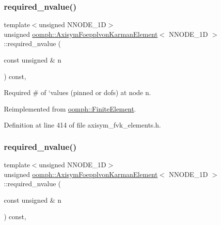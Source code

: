 \subsubsection{\texorpdfstring{required\+\_\+nvalue()}{required\_nvalue()}\hspace{0.1cm}{\footnotesize\ttfamily [1/2]}}
{\footnotesize\ttfamily template$<$unsigned N\+N\+O\+D\+E\+\_\+1D$>$ \\
unsigned \hyperlink{classoomph_1_1AxisymFoepplvonKarmanElement}{oomph\+::\+Axisym\+Foepplvon\+Karman\+Element}$<$ N\+N\+O\+D\+E\+\_\+1D $>$\+::required\+\_\+nvalue (\begin{DoxyParamCaption}\item[{const unsigned \&}]{n }\end{DoxyParamCaption}) const\hspace{0.3cm}{\ttfamily [inline]}, {\ttfamily [virtual]}}



Required \# of `values\textquotesingle{} (pinned or dofs) at node n. 



Reimplemented from \hyperlink{classoomph_1_1FiniteElement_a56610c60d5bc2d7c27407a1455471b1a}{oomph\+::\+Finite\+Element}.



Definition at line 414 of file axisym\+\_\+fvk\+\_\+elements.\+h.

\mbox{\label{classoomph_1_1AxisymFoepplvonKarmanElement_ab481ef11edd5211f38bb6e9936d2351f}} 
\subsubsection{\texorpdfstring{required\+\_\+nvalue()}{required\_nvalue()}\hspace{0.1cm}{\footnotesize\ttfamily [2/2]}}
{\footnotesize\ttfamily template$<$unsigned N\+N\+O\+D\+E\+\_\+1D$>$ \\
unsigned \hyperlink{classoomph_1_1AxisymFoepplvonKarmanElement}{oomph\+::\+Axisym\+Foepplvon\+Karman\+Element}$<$ N\+N\+O\+D\+E\+\_\+1D $>$\+::required\+\_\+nvalue (\begin{DoxyParamCaption}\item[{const unsigned \&}]{n }\end{DoxyParamCaption}) const\hspace{0.3cm}{\ttfamily [inline]}, {\ttfamily [virtual]}}



